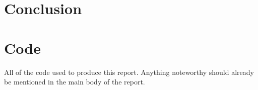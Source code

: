 \documentclass[%
 reprint,
 amsmath,amssymb,
 aps,
]{revtex4-1}
\begin{document}
\section{\label{sect:conclusion}Conclusion}


%


\onecolumngrid %
\newpage %
\appendix*
\section{Code}
All of the code used to produce this report. Anything noteworthy should already be mentioned in the main body of the report.




\twocolumngrid %
\end{document}
